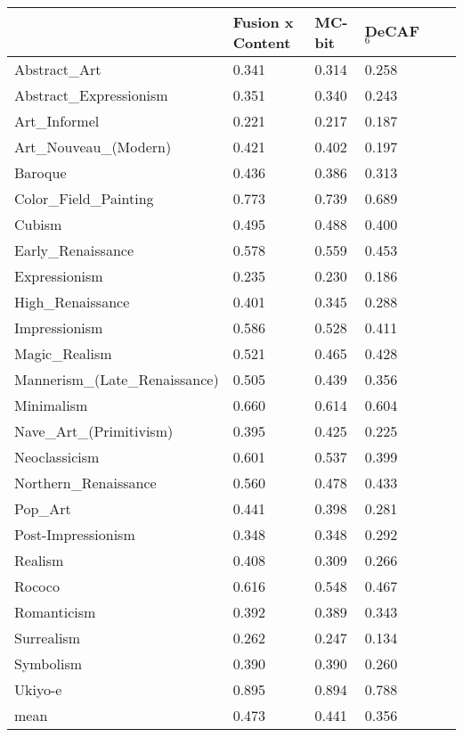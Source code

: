 
\begin{tabular}{llllll}
\toprule
{}                             & Fusion x Content & MC-bit & DeCAF$_6$  \\
\midrule
Abstract\_Art                  & 0.341            & 0.314  & 0.258      \\
Abstract\_Expressionism        & 0.351            & 0.340  & 0.243      \\
Art\_Informel                  & 0.221            & 0.217  & 0.187      \\
Art\_Nouveau\_(Modern)         & 0.421            & 0.402  & 0.197      \\
Baroque                        & 0.436            & 0.386  & 0.313      \\
Color\_Field\_Painting         & 0.773            & 0.739  & 0.689      \\
Cubism                         & 0.495            & 0.488  & 0.400      \\
Early\_Renaissance             & 0.578            & 0.559  & 0.453      \\
Expressionism                  & 0.235            & 0.230  & 0.186      \\
High\_Renaissance              & 0.401            & 0.345  & 0.288      \\
Impressionism                  & 0.586            & 0.528  & 0.411      \\
Magic\_Realism                 & 0.521            & 0.465  & 0.428      \\
Mannerism\_(Late\_Renaissance) & 0.505            & 0.439  & 0.356      \\
Minimalism                     & 0.660            & 0.614  & 0.604      \\
Nave\_Art\_(Primitivism)       & 0.395            & 0.425  & 0.225      \\
Neoclassicism                  & 0.601            & 0.537  & 0.399      \\
Northern\_Renaissance          & 0.560            & 0.478  & 0.433      \\
Pop\_Art                       & 0.441            & 0.398  & 0.281      \\
Post-Impressionism             & 0.348            & 0.348  & 0.292      \\
Realism                        & 0.408            & 0.309  & 0.266      \\
Rococo                         & 0.616            & 0.548  & 0.467      \\
Romanticism                    & 0.392            & 0.389  & 0.343      \\
Surrealism                     & 0.262            & 0.247  & 0.134      \\
Symbolism                      & 0.390            & 0.390  & 0.260      \\
Ukiyo-e                        & 0.895            & 0.894  & 0.788      \\
\midrule
mean                           & 0.473            & 0.441  & 0.356      \\
\bottomrule
\end{tabular}
